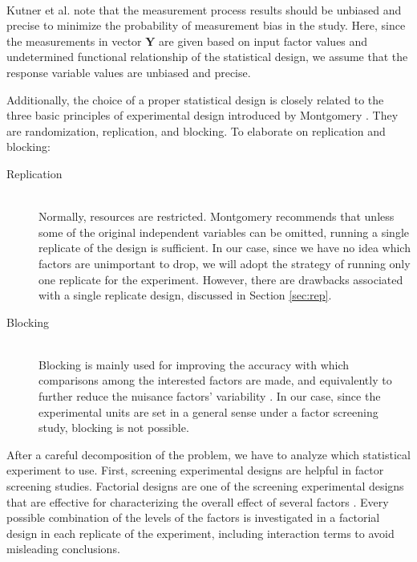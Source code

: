 \documentclass[11pt]{article}
\begin{document}
\begin{description}[style = unboxed]
\item [The outcome measurements that are made on the experimental units.] \hfill \\ Kutner et al. \cite{bk:dae1} note that the measurement process results should be unbiased and precise to minimize the probability of measurement bias in the study. Here, since the measurements in vector $\pmb{Y}$ are given based on input factor values and undetermined functional relationship of the statistical design, we assume that the response variable values are unbiased and precise.
\end{description}

Additionally, the choice of a proper statistical design is closely related to the three basic principles of experimental design introduced by Montgomery \cite{bk:dae2}. They are randomization, replication, and blocking. To elaborate on replication and blocking:

\begin{description}
\item [Replication] \hfill \\ Normally, resources are restricted. Montgomery \cite{bk:dae2} recommends that unless some of the original independent variables can be omitted, running a single replicate of the design is sufficient. In our case, since we have no idea which factors are unimportant to drop, we will adopt the strategy of running only one replicate for the experiment. However, there are drawbacks associated with a single replicate design, discussed in Section \ref{sec:rep}.

\item [Blocking] \hfill \\ Blocking is mainly used for improving the accuracy with which comparisons among the interested factors are made, and equivalently to further reduce the nuisance factors' variability \cite{bk:dae2}. In our case, since the experimental units are set in a general sense under a factor screening study, blocking is not possible.
\end{description}

After a careful decomposition of the problem, we have to analyze which statistical experiment to use. First, screening experimental designs are helpful in factor screening studies. Factorial designs are one of the screening experimental designs that are effective for characterizing the overall effect of several factors \cite{bk:dae1, bk:dae2}. Every possible combination of the levels of the factors is investigated in a factorial design in each replicate of the experiment, including interaction terms to avoid misleading conclusions.
\end{document}

